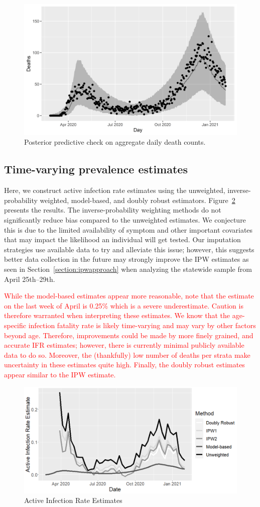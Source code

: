 \documentclass[11pt]{amsart}
\numberwithin{equation}{section}
\theoremstyle{plain}
\begin{document}
\begin{figure}[!th]
\centering
\includegraphics[width=.6\linewidth]{../figs/deaths_ppc.png}
\caption{Posterior predictive check on aggregate daily death counts.}
\label{fig:deathsppc}
\end{figure}

\subsection{Time-varying prevalence estimates}

Here, we construct active infection rate estimates using the unweighted, inverse-probability weighted, model-based, and doubly robust estimators.  Figure~\ref{fig:air} presents the results. The inverse-probability weighting methods do not significantly reduce bias compared to the unweighted estimates.  We conjecture this is due to the limited availability of symptom and other important covariates that may impact the likelihood an individual will get  tested. Our imputation strategies use available data to try and alleviate this issue; however, this suggests better data collection in the future may strongly improve the IPW estimates as seen in Section~\ref{section:ipwapproach} when analyzing the statewide sample from April 25th--29th.

\textcolor{red}{
While the model-based estimates appear more reasonable, note that the estimate on the last week of April is 0.25\% which is a severe underestimate. Caution is therefore warranted when interpreting these estimates.  We know that the age-specific infection fatality rate is likely time-varying and may vary by other factors beyond age.  Therefore, improvements could be made by more finely grained, and accurate IFR estimates; however, there is currently minimal publicly available data to do so.  Moreover, the (thankfully) low number of deaths per strata make uncertainty in these estimates quite high.  Finally, the doubly robust estimates appear similar to the IPW estimate.
}

\begin{figure}[!th]
\centering
\includegraphics[width=.6\linewidth]{../figs/tv_air.png}
\caption{Active Infection Rate Estimates}
\label{fig:air}
\end{figure}
\end{document}
